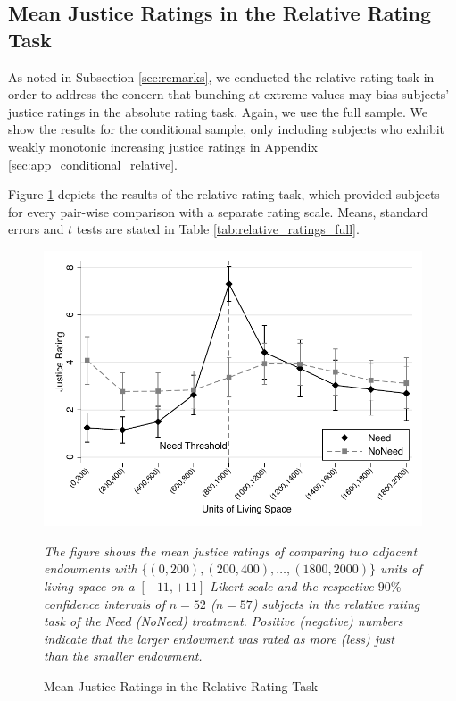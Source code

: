 \documentclass[12pt]{scrartcl}
\begin{document}
\subsection{Mean Justice Ratings in the Relative Rating Task}\label{sec:relative}
As noted in Subsection \ref{sec:remarks}, we conducted the relative rating task in order to address the concern that bunching at extreme values may bias subjects' justice ratings in the absolute rating task.
Again, we use the full sample.
We show the results for the conditional sample, only including subjects who exhibit weakly monotonic increasing justice ratings in Appendix \ref{sec:app_conditional_relative}.

Figure \ref{fig:relative_ratings_full} depicts the results of the relative rating task, which provided subjects for every pair-wise comparison with a separate rating scale.
Means, standard errors and $t$ tests are stated in Table \ref{tab:relative_ratings_full}.

\begin{figure}[h]
   \centering
   \includegraphics{figures/figure_2.pdf}
   \begin{minipage}{\linewidth}
      \footnotesize
      \textit{The figure shows the mean justice ratings of comparing two adjacent endowments with $\{(0,200),(200,400),\ldots,(1800,2000)\}$ units of living space on a $[-11,+11]$ Likert scale and the respective $90\%$ confidence intervals of $n=52$ ($n=57$) subjects in the relative rating task of the Need (NoNeed) treatment. Positive (negative) numbers indicate that the larger endowment was rated as more (less) just than the smaller endowment.}
   \end{minipage}
   \caption{Mean Justice Ratings in the Relative Rating Task}
   \label{fig:relative_ratings_full}
\end{figure}
\end{document}
